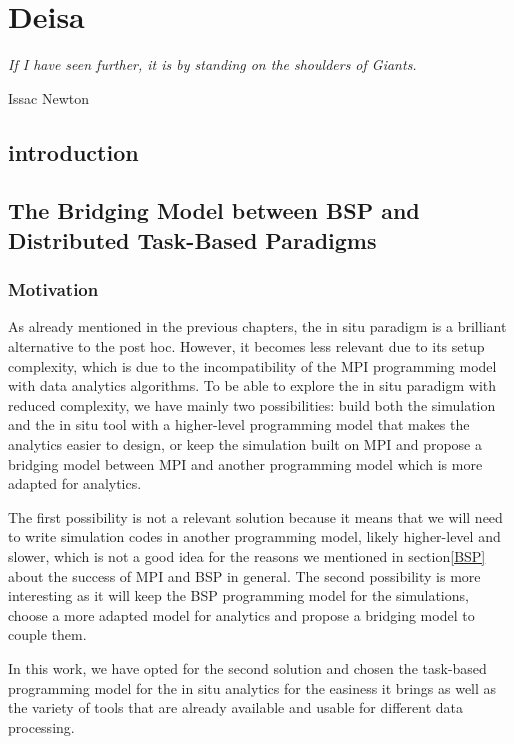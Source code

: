 \chapter{Deisa}



\epigraph{\textit{If I have seen further, it is by standing on the shoulders of Giants.}} {Issac Newton}



\section{introduction}

\section{The Bridging Model between BSP and Distributed Task-Based Paradigms}

\subsection{Motivation}
As already mentioned in the previous chapters, the in situ paradigm is a brilliant alternative to the post hoc. However, it becomes less relevant due to its setup complexity, which is due to the incompatibility of the MPI programming model with data analytics algorithms. To be able to explore the in situ paradigm with reduced complexity, we have mainly two possibilities: build both the simulation and the in situ tool with a higher-level programming model that makes the analytics easier to design, or keep the simulation built on MPI and propose a bridging model between MPI and another programming model which is more adapted for analytics.

The first possibility is not a relevant solution because it means that we will need to write simulation codes in another programming model, likely higher-level and slower, which is not a good idea for the reasons we mentioned in section\ref{BSP} about the success of MPI and BSP in general. 
The second possibility is more interesting as it will keep the BSP programming model for the simulations, choose a more adapted model for analytics and propose a bridging model to couple them. 

In this work, we have opted for the second solution and chosen the task-based programming model for the in situ analytics for the easiness it brings as well as the variety of tools that are already available and usable for different data processing.     

